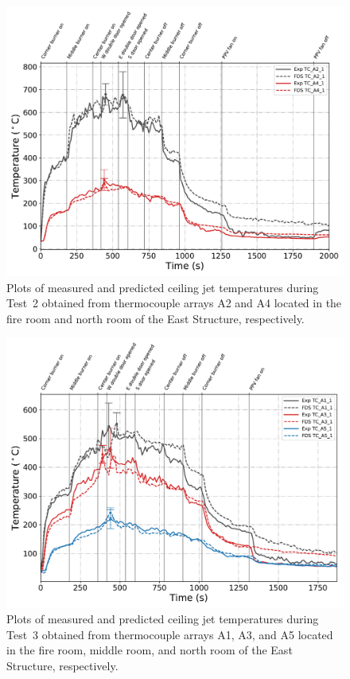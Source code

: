 \begin{figure}[!h]
	\centering
	\includegraphics[width=\columnwidth]{Figures/Plots/Validation/Temperature/Test_2_cjet_2}
	\caption[Plots of measured and predicted ceiling jet temperatures during Test~2.]{Plots of measured and predicted ceiling jet temperatures during Test~2 obtained from thermocouple arrays A2 and A4 located in the fire room and north room of the East Structure, respectively.}
	\label{fig:cjet2_data_Test2}
\end{figure}

\begin{figure}[!h]
	\centering
	\includegraphics[width=\columnwidth]{Figures/Plots/Validation/Temperature/Test_3_cjet_1}
	\caption[Plots of measured and predicted ceiling jet temperatures during Test~3.]{Plots of measured and predicted ceiling jet temperatures during Test~3 obtained from thermocouple arrays A1, A3, and A5 located in the fire room, middle room, and north room of the East Structure, respectively.}
	\label{fig:cjet1_data_Test3}
\end{figure}

